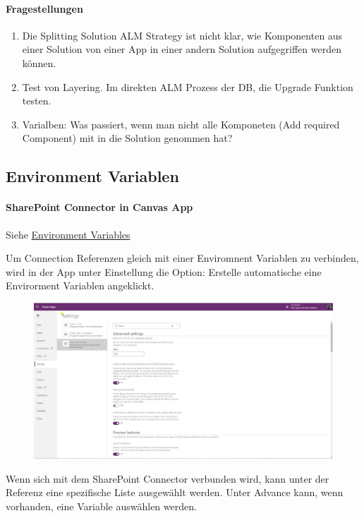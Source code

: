 \paragraph{Fragestellungen}
\begin{enumerate}
	\item Die Splitting Solution \gls{ALM} Strategy ist nicht klar, wie Komponenten aus einer Solution von einer App in einer andern Solution aufgegriffen werden können.
	\item Test von Layering. Im direkten ALM Prozess der DB, die Upgrade Funktion testen.
	\item \Env Varialben: Was passiert, wenn man nicht alle Komponeten (Add required Component) mit in die Solution genommen hat?
\end{enumerate}

\subsection{Environment Variablen}
\paragraph{SharePoint Connector in Canvas App}
Siehe \href{https://docs.microsoft.com/en-us/powerapps/maker/data-platform/environmentvariables#how-do-they-work}{Environment Variables}

Um Connection Referenzen gleich mit einer Enviromnent Variablen zu verbinden, wird in der App unter Einstellung die Option: Erstelle automatische eine Envirorment Variablen angeklickt.

\begin{figure}[H]
	\centering
	\includegraphics[scale = 0.3]{attachment/chapter_13/Scc054}
\end{figure}

Wenn sich mit dem SharePoint Connector verbunden wird, kann unter der Referenz eine spezifische Liste ausgewählt werden. Unter Advance kann, wenn vorhanden, eine \Env Variable auswählen werden.

